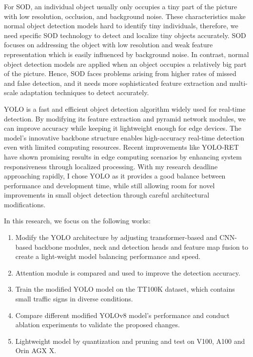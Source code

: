 \documentclass[10pt]{article}
\begin{document}
For SOD, an individual object usually only occupies a tiny part of the picture with low resolution, occlusion, and background noise. These characteristics make normal object detection models hard to identify tiny individuals, therefore, we need specific SOD technology to detect and localize tiny objects accurately. SOD focuses on addressing the object with low resolution and weak feature representation which is easily influenced by background noise. In contrast, normal object detection models are applied when an object occupies a relatively big part of the picture. Hence, SOD faces problems arising from higher rates of missed and false detection, and it needs more sophisticated feature extraction and multi-scale adaptation techniques to detect accurately\cite{li2024ltea,han2024small}. 

YOLO is a fast and efficient object detection algorithm widely used for real-time detection. By modifying its feature extraction and pyramid network modules, we can improve accuracy while keeping it lightweight enough for edge devices\cite{ni2024yolo}. The model's innovative backbone structure enables high-accuracy real-time detection even with limited computing resources. Recent improvements like YOLO-RET have shown promising results in edge computing scenarios by enhancing system responsiveness through localized processing\cite{ret2022}. With my research deadline approaching rapidly, I chose YOLO as it provides a good balance between performance and development time, while still allowing room for novel improvements in small object detection through careful architectural modifications.

In this research, we focus on the following works:

 \begin{enumerate}
    \item Modify the YOLO architecture by adjusting transformer-based and CNN-based backbone modules, neck and detection heads and feature map fusion to create a light-weight model balancing performance and speed.
    \item Attention module is compared and used to improve the detection accuracy.
    \item Train the modified YOLO model on the TT100K dataset\cite{zzl}, which contains small traffic signs in diverse conditions.
    \item Compare different modified YOLOv8 model's performance and conduct ablation experiments to validate the proposed changes.
    \item Lightweight model by quantization and pruning and test on V100, A100 and Orin AGX X.
\end{enumerate}
\end{document}
